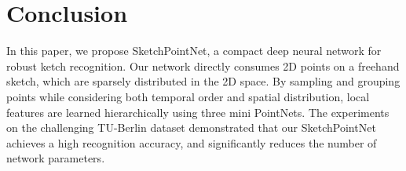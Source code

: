 \section{Conclusion}
\label{sec:conclusion}

In this paper, we propose SketchPointNet, a compact deep neural network for robust ketch recognition.
%
Our network directly consumes 2D points on a freehand sketch, which are sparsely distributed in the 2D space. 
%
By sampling and grouping points while considering both temporal order and spatial distribution, local features are learned hierarchically using three mini PointNets. 
%
The experiments on the challenging TU-Berlin dataset demonstrated that our SketchPointNet achieves a high recognition accuracy, and significantly reduces the number of network parameters. 